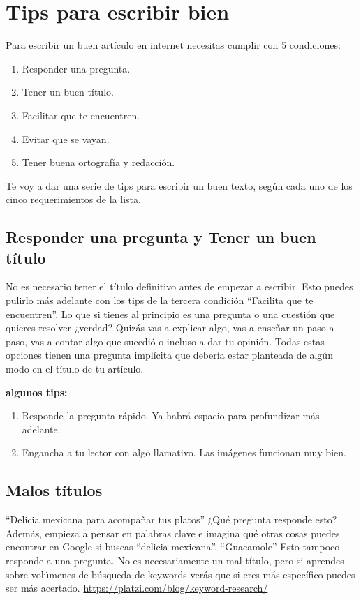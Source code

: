 \documentclass{article}
\begin{document}
    \section{Tips para escribir bien}

    Para escribir un buen artículo en internet necesitas cumplir con 5 condiciones:
    \begin{enumerate}
        \item Responder una pregunta.
        \item Tener un buen título.
        \item Facilitar que te encuentren.
        \item Evitar que se vayan.
        \item Tener buena ortografía y redacción.
    \end{enumerate}
    Te voy a dar una serie de tips para escribir un buen texto, según cada uno de los cinco requerimientos de la lista.
    \subsection{Responder una pregunta y Tener un buen título}
    No es necesario tener el título definitivo antes de empezar a escribir. Esto puedes pulirlo más adelante con los tips de la tercera condición “Facilita que te encuentren”. Lo que si tienes al principio es una pregunta o una cuestión que quieres resolver ¿verdad? Quizás vas a explicar algo, vas a enseñar un paso a paso, vas a contar algo que sucedió o incluso a dar tu opinión. Todas estas opciones tienen una pregunta implícita que debería estar planteada de algún modo en el título de tu artículo.

    \textbf{algunos tips:}
    \begin{enumerate}
        \item Responde la pregunta rápido. Ya habrá espacio para profundizar más adelante.
        \item Engancha a tu lector con algo llamativo. Las imágenes funcionan muy bien.
    \end{enumerate}
    \subsection{Malos títulos}
    “Delicia mexicana para acompañar tus platos”
    ¿Qué pregunta responde esto? Además, empieza a pensar en palabras clave e imagina qué otras cosas puedes encontrar en Google si buscas “delicia mexicana”.
    “Guacamole”
    Esto tampoco responde a una pregunta. No es necesariamente un mal título, pero si aprendes sobre volúmenes de búsqueda de keywords verás que si eres más específico puedes ser más acertado.
    \url{https://platzi.com/blog/keyword-research/}
\end{document}
